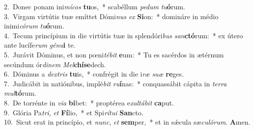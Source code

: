 {2.~}Donec ponam ini\textit{mí}\textit{cos} \textbf{tu}os,~* scabéllum \textit{pe}\textit{dum} \textit{tu}\textbf{ó}rum.\\
{3.~}Virgam virtútis tuæ emíttet Dómi\textit{nus} \textit{ex} \textbf{Si}on:~* domináre in médio inimi\textit{có}\textit{rum} \textit{tu}\textbf{ó}rum.\\
{4.~}Tecum princípium in die virtútis tuæ in splendóri\textit{bus} \textit{san}\textbf{ctó}rum:~* ex útero ante lucífe\textit{rum} \textit{gé}\textit{nu}\textbf{i} te.\\
{5.~}Jurávit Dóminus, et non pœni\textit{té}\textit{bit} \textbf{e}um:~* Tu es sacérdos in ætérnum secúndum ór\textit{di}\textit{nem} \textit{Mel}\textbf{chí}\textbf{se}dech.\\
{6.~}Dóminus a \textit{dex}\textit{tris} \textbf{tu}is,~* confrégit in die i\textit{ræ} \textit{su}\textit{æ} \textbf{re}ges.\\
{7.~}Judicábit in natiónibus, implé\textit{bit} \textit{ru}\textbf{í}nas:~* conquassábit cápita in \textit{ter}\textit{ra} \textit{mul}\textbf{tó}rum.\\
{8.~}De torrénte in \textit{vi}\textit{a} \textbf{bi}bet:~* proptérea e\textit{xal}\textit{tá}\textit{bit} \textbf{ca}put.\\
{9.~}Glória Pa\textit{tri}, \textit{et} \textbf{Fí}lio,~* et Spi\textit{rí}\textit{tu}\textit{i} \textbf{San}cto.\\
{10.~}Sicut erat in princípio, et \textit{nunc}, \textit{et} \textbf{sem}per,~* et in sǽcula sæ\textit{cu}\textit{ló}\textit{rum}. \textbf{A}men.\\
